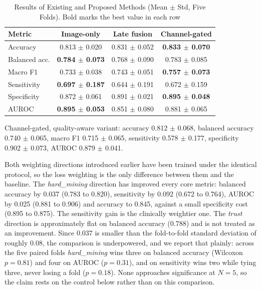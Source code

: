 \documentclass[conference]{IEEEtran}
\begin{document}
\begin{table}[htbp]
\caption{Results of Existing and Proposed Methods (Mean $\pm$ Std, Five Folds). Bold marks the best value in each row}
\label{tab:ablation}
\centering
\scriptsize
\setlength{\tabcolsep}{2pt}
\begin{tabular}{|l|c|c|c|}
\hline
\textbf{Metric} & \textbf{Image-only} & \textbf{Late fusion} & \textbf{Channel-gated} \\
\hline
Accuracy & 0.813 $\pm$ 0.020 & 0.831 $\pm$ 0.052 & \textbf{0.833 $\pm$ 0.070} \\
Balanced acc. & \textbf{0.784 $\pm$ 0.073} & 0.768 $\pm$ 0.090 & 0.783 $\pm$ 0.085 \\
Macro F1 & 0.733 $\pm$ 0.038 & 0.743 $\pm$ 0.051 & \textbf{0.757 $\pm$ 0.073} \\
Sensitivity & \textbf{0.697 $\pm$ 0.187} & 0.644 $\pm$ 0.191 & 0.672 $\pm$ 0.159 \\
Specificity & 0.872 $\pm$ 0.061 & 0.891 $\pm$ 0.021 & \textbf{0.895 $\pm$ 0.048} \\
AUROC & \textbf{0.895 $\pm$ 0.053} & 0.851 $\pm$ 0.080 & 0.881 $\pm$ 0.065 \\
\hline
\end{tabular}
\par\vspace{2pt}\footnotesize Channel-gated, quality-aware variant: accuracy 0.812 $\pm$ 0.068, balanced accuracy 0.740 $\pm$ 0.065, macro F1 0.715 $\pm$ 0.065, sensitivity 0.578 $\pm$ 0.177, specificity 0.902 $\pm$ 0.073, AUROC 0.879 $\pm$ 0.041.
\end{table}

Both weighting directions introduced earlier have been trained under the identical protocol, so the loss weighting is the only difference between them and the baseline. The \emph{hard\_mining} direction has improved every core metric: balanced accuracy by 0.037 (0.783 to 0.820), sensitivity by 0.092 (0.672 to 0.764), AUROC by 0.025 (0.881 to 0.906) and accuracy to 0.845, against a small specificity cost (0.895 to 0.875). The sensitivity gain is the clinically weightier one. The \emph{trust} direction is approximately flat on balanced accuracy (0.788) and is not treated as an improvement. Since 0.037 is smaller than the fold-to-fold standard deviation of roughly 0.08, the comparison is underpowered, and we report that plainly: across the five paired folds \emph{hard\_mining} wins three on balanced accuracy (Wilcoxon $p=0.81$) and four on AUROC ($p=0.31$), and on sensitivity wins two while tying three, never losing a fold ($p=0.18$). None approaches significance at $N=5$, so the claim rests on the control below rather than on this comparison.
\end{document}
